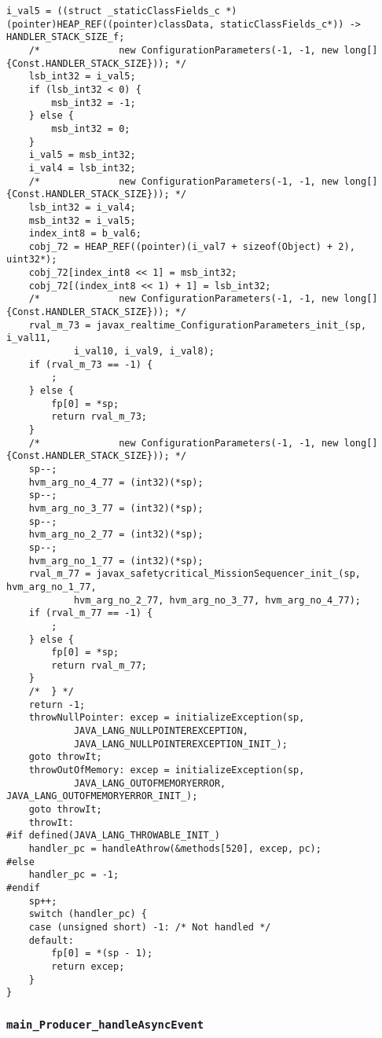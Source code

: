 \begin{landscape}
\begin{multicols}{2}
\begin{lstlisting}[firstnumber=54130]
	i_val5 = ((struct _staticClassFields_c *)(pointer)HEAP_REF((pointer)classData, staticClassFields_c*)) -> HANDLER_STACK_SIZE_f;
	/*				new ConfigurationParameters(-1, -1, new long[] {Const.HANDLER_STACK_SIZE})); */
	lsb_int32 = i_val5;
	if (lsb_int32 < 0) {
		msb_int32 = -1;
	} else {
		msb_int32 = 0;
	}
	i_val5 = msb_int32;
	i_val4 = lsb_int32;
	/*				new ConfigurationParameters(-1, -1, new long[] {Const.HANDLER_STACK_SIZE})); */
	lsb_int32 = i_val4;
	msb_int32 = i_val5;
	index_int8 = b_val6;
	cobj_72 = HEAP_REF((pointer)(i_val7 + sizeof(Object) + 2), uint32*);
	cobj_72[index_int8 << 1] = msb_int32;
	cobj_72[(index_int8 << 1) + 1] = lsb_int32;
	/*				new ConfigurationParameters(-1, -1, new long[] {Const.HANDLER_STACK_SIZE})); */
	rval_m_73 = javax_realtime_ConfigurationParameters_init_(sp, i_val11,
			i_val10, i_val9, i_val8);
	if (rval_m_73 == -1) {
		;
	} else {
		fp[0] = *sp;
		return rval_m_73;
	}
	/*				new ConfigurationParameters(-1, -1, new long[] {Const.HANDLER_STACK_SIZE})); */
	sp--;
	hvm_arg_no_4_77 = (int32)(*sp);
	sp--;
	hvm_arg_no_3_77 = (int32)(*sp);
	sp--;
	hvm_arg_no_2_77 = (int32)(*sp);
	sp--;
	hvm_arg_no_1_77 = (int32)(*sp);
	rval_m_77 = javax_safetycritical_MissionSequencer_init_(sp, hvm_arg_no_1_77,
			hvm_arg_no_2_77, hvm_arg_no_3_77, hvm_arg_no_4_77);
	if (rval_m_77 == -1) {
		;
	} else {
		fp[0] = *sp;
		return rval_m_77;
	}
	/*	} */
	return -1;
	throwNullPointer: excep = initializeException(sp,
			JAVA_LANG_NULLPOINTEREXCEPTION,
			JAVA_LANG_NULLPOINTEREXCEPTION_INIT_);
	goto throwIt;
	throwOutOfMemory: excep = initializeException(sp,
			JAVA_LANG_OUTOFMEMORYERROR, JAVA_LANG_OUTOFMEMORYERROR_INIT_);
	goto throwIt;
	throwIt:
#if defined(JAVA_LANG_THROWABLE_INIT_)
	handler_pc = handleAthrow(&methods[520], excep, pc);
#else
	handler_pc = -1;
#endif
	sp++;
	switch (handler_pc) {
	case (unsigned short) -1: /* Not handled */
	default:
		fp[0] = *(sp - 1);
		return excep;
	}
}
\end{lstlisting}

\subsubsection{\texttt{main\_Producer\_handleAsyncEvent}}


\end{multicols}
\end{landscape}
